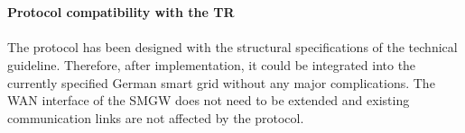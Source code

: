 \\
\\
\textbf{Protocol compatibility with the TR}
\\
\\
The protocol has been designed with the structural specifications of the technical guideline. Therefore, after implementation, it could be integrated into the currently specified German smart grid without any major complications. The WAN interface of the SMGW does not need to be extended and existing communication links are not affected by the protocol. 



\clearpage





